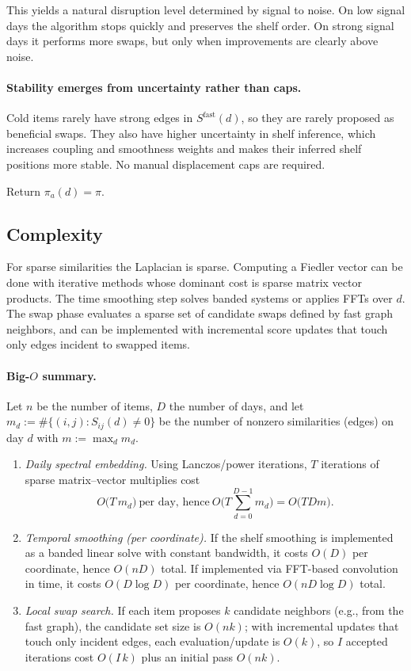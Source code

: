 \documentclass[11pt]{article}
\begin{document}
This yields a natural disruption level determined by signal to noise.
On low signal days the algorithm stops quickly and preserves the shelf order.
On strong signal days it performs more swaps, but only when improvements are clearly above noise.

\paragraph{Stability emerges from uncertainty rather than caps.}
Cold items rarely have strong edges in $S^{\text{fast}}(d)$, so they are rarely proposed as beneficial swaps.
They also have higher uncertainty in shelf inference, which increases coupling and smoothness weights and makes their inferred shelf positions more stable.
No manual displacement caps are required.

Return $\pi_a(d)=\pi$.

\subsection{Complexity}
For sparse similarities the Laplacian is sparse.
Computing a Fiedler vector can be done with iterative methods whose dominant cost is sparse matrix vector products.
The time smoothing step solves banded systems or applies FFTs over $d$.
The swap phase evaluates a sparse set of candidate swaps defined by fast graph neighbors, and can be implemented with incremental score updates that touch only edges incident to swapped items.

\paragraph{Big-$O$ summary.}
Let $n$ be the number of items, $D$ the number of days, and let $m_d:=\#\{(i,j): S_{ij}(d)\neq 0\}$ be the number of nonzero similarities (edges) on day $d$ with $m:=\max_d m_d$.
\begin{enumerate}
\item \emph{Daily spectral embedding.} Using Lanczos/power iterations, $T$ iterations of sparse matrix--vector multiplies cost
\[
O\bigl(T\,m_d\bigr)\ \text{per day, hence}\ O\bigl(T\sum_{d=0}^{D-1} m_d\bigr)=O\bigl(T D m\bigr).
\]
\item \emph{Temporal smoothing (per coordinate).} If the shelf smoothing is implemented as a banded linear solve with constant bandwidth, it costs $O(D)$ per coordinate, hence $O(nD)$ total. If implemented via FFT-based convolution in time, it costs $O(D\log D)$ per coordinate, hence $O(nD\log D)$ total.
\item \emph{Local swap search.} If each item proposes $k$ candidate neighbors (e.g., from the fast graph), the candidate set size is $O(nk)$; with incremental updates that touch only incident edges, each evaluation/update is $O(k)$, so $I$ accepted iterations cost $O(I\,k)$ plus an initial pass $O(nk)$.
\end{enumerate}
\end{document}

